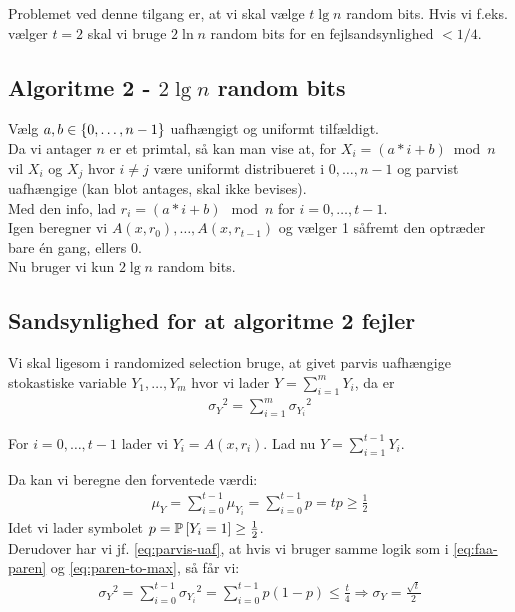 Problemet ved denne tilgang er, at vi skal vælge $t \lg n$ random bits. Hvis vi f.eks. vælger $t = 2$ skal vi bruge $2 \ln n$ random bits for en fejlsandsynlighed $< 1/4$.

\subsection{Algoritme 2 - $2 \lg n$ random bits}
Vælg $a, b \in \curly{0, \dots, n-1}$ uafhængigt og uniformt tilfældigt.\\

Da vi antager $n$ er et primtal, så kan man vise at, for $X_i = (a * i + b) \bmod n$ vil $X_i$ og $X_j$ hvor $i \neq j$ være uniformt distribueret i $0, \dots, n-1$ og parvist uafhængige (kan blot antages, skal ikke bevises).\\

Med den info, lad $r_i = (a * i + b) \mod n$ for $i = 0, \dots, t-1$.\\
Igen beregner vi $A(x, r_0), \dots, A(x, r_{t-1})$ og vælger 1 såfremt den optræder bare én gang, ellers 0.\\

Nu bruger vi kun $2 \lg n$ random bits.

\subsection{Sandsynlighed for at algoritme 2 fejler}
Vi skal ligesom i randomized selection bruge, at givet parvis uafhængige stokastiske variable $Y_1, \dots, Y_m$ hvor vi lader $Y = \sum_{i=1}^m Y_i$, da er
\begin{align}
  {\sigma_Y}^2 = \sum_{i=1}^m {\sigma_{Y_i}}^2 \label{eq:parvis-uaf}
\end{align}\vspace{2em}

For $i = 0, \dots, t-1$ lader vi $Y_i = A(x, r_i)$. Lad nu $Y = \sum_{i=1}^{t-1} Y_i$.

Da kan vi beregne den forventede værdi:
\begin{align}
  \mu_Y = \sum_{i=0}^{t-1} \mu_{Y_i} = \sum_{i=0}^{t-1} p = tp \geq \frac{1}{2} \label{eq:mu-y-ulighed}
\end{align}
Idet vi lader symbolet $p = \P{Y_i = 1} \geq \frac{1}{2}$.\\

Derudover har vi jf. \cref{eq:parvis-uaf}, at hvis vi bruger samme logik som i \cref{eq:faa-paren} og \cref{eq:paren-to-max}, så får vi:
\begin{align*}
  {\sigma_Y}^2
  = \sum_{i=0}^{t-1} {\sigma_{Y_i}}^2
  = \sum_{i=0}^{t-1} p(1-p)
  \leq \frac{t}{4} \Longrightarrow \sigma_Y
  = \frac{\sqrt{t}}{2}
\end{align*}

